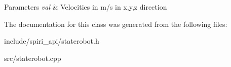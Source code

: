 \begin{DoxyParams}{\-Parameters}
{\em val} & \-Velocities in m/s in x,y,z direction \\
\hline
\end{DoxyParams}


\-The documentation for this class was generated from the following files\-:\begin{DoxyCompactItemize}
\item 
include/spiri\-\_\-api/staterobot.\-h\item 
src/staterobot.\-cpp\end{DoxyCompactItemize}
